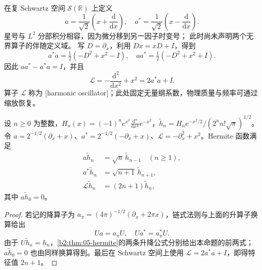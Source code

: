 在复 Schwartz 空间 \(\mathcal S(\mathbb R)\) 上定义
\[a=\frac1{\sqrt2}\left(x+\frac{\mathrm d}{\mathrm dx}\right),\quad
 a^*=\frac1{\sqrt2}\left(x-\frac{\mathrm d}{\mathrm dx}\right).
\]
星号与 \(L^2\) 分部积分相容，因为微分移到另一因子时变号；
此时尚未声明两个无界算子的伴随定义域。
写 \(D=\partial_x\)，利用 \(Dx=xD+I\)，得到
\[
 a^*a=\tfrac12(-D^2+x^2-I),\quad
 aa^*=\tfrac12(-D^2+x^2+I).
\]
因此 \(aa^*-a^*a=I\)，并且
\[\mathcal L=-\frac{\mathrm d^2}{\mathrm dx^2}+x^2=2a^*a+I.\]
算子 \(\mathcal L\) 称为 [harmonic oscillator]；此处固定无量纲系数，物理质量与频率可通过缩放恢复。

\begin{proposition}[谐振子的特征函数]
\label{b2:prop:B2-oscillator-eigenfunctions}
设 \(n\geq0\) 为整数，\(H_n(x)=(-1)^ne^{x^2}\frac{\mathrm d^n}{\mathrm dx^n}e^{-x^2}\)，\(\widetilde h_n=H_ne^{-x^2/2}/(2^nn!\sqrt\pi)^{1/2}\)。令 \(a=2^{-1/2}(\partial_x+x)\)、\(a^*=2^{-1/2}(-\partial_x+x)\)、\(\mathcal L=-\partial_x^2+x^2\)。Hermite 函数满足
\[
 \begin{aligned}
 a\widetilde h_n&=\sqrt n\,\widetilde h_{n-1}\quad(n\geq1),\\
 a^*\widetilde h_n&=\sqrt{n+1}\,\widetilde h_{n+1},\\
 \mathcal L\widetilde h_n&=(2n+1)\widetilde h_n,
 \end{aligned}
\]
其中 \(a\widetilde h_0=0\)。
\end{proposition}
\begin{proof}
若记的降算子为 \(a_\pi=(4\pi)^{-1/2}(\partial_x+2\pi x)\)，链式法则与上面的升算子换算给出
\[
 Ua=a_\pi U,\quad Ua^*=a_\pi^*U.
\]
由于 \(U\widetilde h_n=h_n\)，\cref{b2:thm:05-hermite}的两条升降公式分别给出本命题的前两式；\(a\widetilde h_0=0\) 也由同样换算得到。最后在 Schwartz 空间上使用 \(\mathcal L=2a^*a+I\)，即得特征值 \(2n+1\)。
\end{proof}

